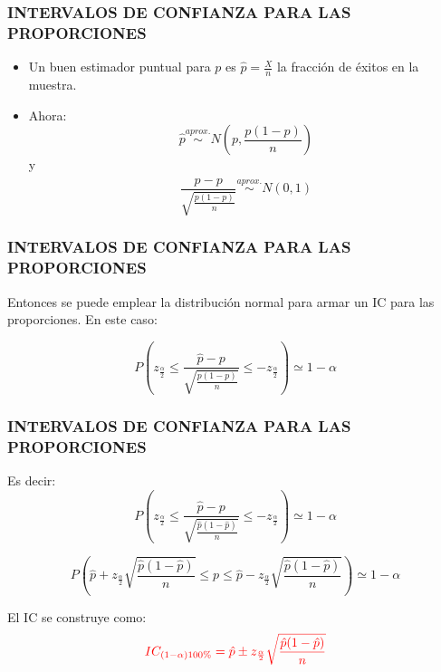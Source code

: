 \documentclass{beamer}
\begin{document}

\begin{frame}
\frametitle{INTERVALOS DE CONFIANZA PARA LAS PROPORCIONES }

\begin{itemize}
\item Un buen estimador puntual para $p$ es $\hat{p}=\frac{X}{n}$ la
fracción de éxitos en la muestra. 
\item Ahora: $$\hat{p}\stackrel{aprox.}\sim N(p,\frac{p(1-p)}{n})$$
y
$$\frac{\hat{p}-p}{\sqrt{\frac{p(1-p)}{n}}}\stackrel{aprox.}\sim N(0,1)$$
\end{itemize}
\end{frame}



\begin{frame}
\frametitle{INTERVALOS DE CONFIANZA PARA LAS PROPORCIONES }

Entonces se puede emplear la distribución normal para armar un IC
para las proporciones. En este caso:

$$P(z_{\frac{\alpha}{2}}\leq \frac{\hat{p}-p}{\sqrt{\frac{p(1-p)}{n}}}\leq -z_{\frac{\alpha}{2}} )\simeq 1-\alpha$$

\end{frame}


\begin{frame}
\frametitle{INTERVALOS DE CONFIANZA PARA LAS PROPORCIONES }

Es decir:
$$P(z_{\frac{\alpha}{2}}\leq \frac{\hat{p}-p}{\sqrt{\frac{\hat{p}(1-\hat{p})}{n}}}\leq -z_{\frac{\alpha}{2}} )\simeq 1-\alpha$$

$$P(\hat{p}+z_{\frac{\alpha}{2}}\sqrt{\frac{\hat{p}(1-\hat{p})}{n}}\leq p \leq \hat{p}-z_{\frac{\alpha}{2}}\sqrt{\frac{\hat{p}(1-\hat{p})}{n}} )\simeq 1-\alpha$$

El IC se construye como:
$$\color{red}{IC_{(1-\alpha)100\%}=\hat{p}\pm z_{\frac{\alpha}{2}}\sqrt{\frac{\hat{p}(1-\hat{p})}{n}}}$$
\end{frame}
\end{document}
